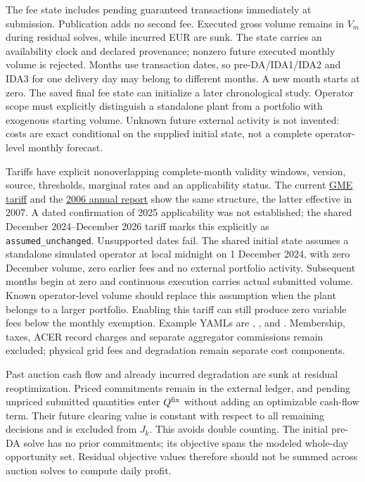 \documentclass[11pt,a4paper]{article}
\begin{document}
The fee state includes pending guaranteed transactions immediately at submission.
Publication adds no second fee. Executed gross volume remains in $V_m$ during
residual solves, while incurred EUR are sunk. The state carries an availability
clock and declared provenance; nonzero future executed monthly volume is
rejected. Months use transaction dates, so pre-DA/IDA1/IDA2 and IDA3 for one
delivery day may belong to different months. A new month starts at zero.
The saved final fee state can initialize a later chronological study. Operator
scope must explicitly distinguish a standalone plant from a portfolio with
exogenous starting volume. Unknown future external activity is not invented:
costs are exact conditional on the supplied initial state, not a complete
operator-level monthly forecast.

Tariffs have explicit nonoverlapping complete-month validity windows, version,
source, thresholds, marginal rates and an applicability status. The current
\href{https://gme.mercatoelettrico.org/it-it/Home/Accesso-ai-Mercati/Elettricita/MercatiElettrici/CorrispettiviSettlement/CorrispettiviElettricita}{GME tariff}
and the \href{https://gme.mercatoelettrico.org/Portals/0/Documents/it-IT/20070502Bilancio2006.pdf}{2006 annual report}
show the same structure, the latter effective in 2007. A dated confirmation of
2025 applicability was not established; the shared December 2024--December 2026 tariff marks
this explicitly as \texttt{assumed\_unchanged}. Unsupported dates fail.
The shared initial state assumes a standalone simulated operator at local
midnight on 1 December 2024, with zero December volume, zero earlier fees and
no external portfolio activity. Subsequent months begin at zero and continuous
execution carries actual submitted volume. Known operator-level volume should
replace this assumption when the plant belongs to a larger portfolio. Enabling
this tariff can still produce zero variable fees below the monthly exemption.
Example YAMLs are
,
, and
.
Membership, taxes, ACER record charges and separate aggregator commissions remain
excluded; physical grid fees and degradation remain separate cost components.

Past auction cash flow and already incurred degradation are sunk at residual
reoptimization. Priced commitments remain in the external ledger, and pending
unpriced submitted quantities enter $Q^{\rm fix}$ without adding an optimizable
cash-flow term. Their future clearing value is constant with respect to all
remaining decisions and is excluded from $J_k$. This avoids double counting.
The initial pre-DA solve has no prior commitments; its objective spans the
modeled whole-day opportunity set. Residual objective values therefore should
not be summed across auction solves to compute daily profit.
\end{document}
